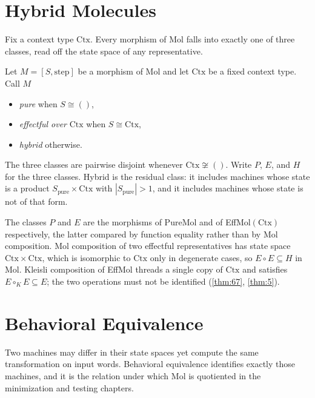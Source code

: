 \section{Hybrid Molecules}\label{sec:mol-hybrid}

Fix a context type $\mathrm{Ctx}$. Every morphism of Mol falls into
exactly one of three classes, read off the state space of any
representative.

\begin{definition}\label{def:hybridmol}
Let $M = [S, \mathrm{step}]$ be a morphism of Mol and let $\mathrm{Ctx}$
be a fixed context type. Call $M$
\begin{itemize}
  \item \emph{pure} when $S \cong ()$,
  \item \emph{effectful over} $\mathrm{Ctx}$ when $S \cong \mathrm{Ctx}$,
  \item \emph{hybrid} otherwise.
\end{itemize}
The three classes are pairwise disjoint whenever $\mathrm{Ctx} \not\cong
()$. Write $P$, $E$, and $H$ for the three classes. Hybrid is the
residual class: it includes machines whose state is a product
$S_{\mathrm{pure}} \times \mathrm{Ctx}$ with $|S_{\mathrm{pure}}| > 1$,
and it includes machines whose state is not of that form.
\end{definition}

\begin{remark}
The classes $P$ and $E$ are the morphisms of PureMol and of
EffMol$(\mathrm{Ctx})$ respectively, the latter compared by function
equality rather than by Mol composition. Mol composition of two
effectful representatives has state space $\mathrm{Ctx} \times
\mathrm{Ctx}$, which is isomorphic to $\mathrm{Ctx}$ only in degenerate
cases, so $E \circ E \subseteq H$ in Mol. Kleisli composition of
EffMol threads a single copy of $\mathrm{Ctx}$ and satisfies
$E \circ_K E \subseteq E$; the two operations must not be identified
(\autoref{thm:67}, \autoref{thm:5}).
\end{remark}

\section{Behavioral Equivalence}\label{sec:mol-bisim}

Two machines may differ in their state spaces yet compute the same
transformation on input words. Behavioral equivalence identifies exactly
those machines, and it is the relation under which Mol is quotiented in the
minimization and testing chapters.


